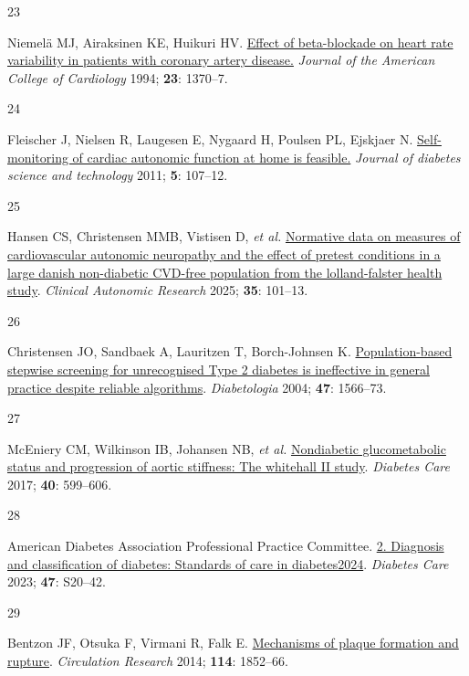 \documentclass[
  a4paper,
  headsepline=true,
  open=any]{scrbook}
\newlength{\cslhangindent}
\newlength{\csllabelwidth}
\newlength{\cslentryspacingunit} %
\newenvironment{CSLReferences}[2] %
 {%
  \setlength{\parindent}{0pt}
  \ifodd #1
  \let\oldpar\par
  \def\par{\hangindent=\cslhangindent\oldpar}
  \fi
  \setlength{\parskip}{#2\cslentryspacingunit}
 }%
 {}
\newcommand{\CSLLeftMargin}[1]{\parbox[t]{\csllabelwidth}{#1}}
\newcommand{\CSLRightInline}[1]{\parbox[t]{\linewidth - \csllabelwidth}{#1}\break}
\begin{document}
\begin{CSLReferences}{0}{0}
\leavevmode{}%
\CSLLeftMargin{23 }%
\CSLRightInline{Niemelä MJ, Airaksinen KE, Huikuri HV.
\href{https://doi.org/10.1016/0735-1097(94)90379-4}{Effect of
beta-blockade on heart rate variability in patients with coronary artery
disease.} \emph{Journal of the American College of Cardiology} 1994;
\textbf{23}: 1370--7.}

\leavevmode{}%
\CSLLeftMargin{24 }%
\CSLRightInline{Fleischer J, Nielsen R, Laugesen E, Nygaard H, Poulsen
PL, Ejskjaer N.
\href{https://doi.org/10.1177/193229681100500115}{Self-monitoring of
cardiac autonomic function at home is feasible.} \emph{Journal of
diabetes science and technology} 2011; \textbf{5}: 107--12.}

\leavevmode{}%
\CSLLeftMargin{25 }%
\CSLRightInline{Hansen CS, Christensen MMB, Vistisen D, \emph{et al.}
\href{https://doi.org/10.1007/s10286-024-01069-6}{Normative data on
measures of cardiovascular autonomic neuropathy and the effect of
pretest conditions in a large danish non-diabetic CVD-free population
from the lolland-falster health study}. \emph{Clinical Autonomic
Research} 2025; \textbf{35}: 101--13.}

\leavevmode{}%
\CSLLeftMargin{26 }%
\CSLRightInline{Christensen JO, Sandbaek A, Lauritzen T, Borch-Johnsen
K. \href{https://doi.org/10.1007/s00125-004-1496-2}{Population-based
stepwise screening for unrecognised Type 2 diabetes is ineffective in
general practice despite reliable algorithms}. \emph{Diabetologia} 2004;
\textbf{47}: 1566--73.}

\leavevmode{}%
\CSLLeftMargin{27 }%
\CSLRightInline{McEniery CM, Wilkinson IB, Johansen NB, \emph{et al.}
\href{https://doi.org/10.2337/dc16-1773}{Nondiabetic glucometabolic
status and progression of aortic stiffness: The whitehall II study}.
\emph{Diabetes Care} 2017; \textbf{40}: 599--606.}

\leavevmode{}%
\CSLLeftMargin{28 }%
\CSLRightInline{American Diabetes Association Professional Practice
Committee. \href{https://doi.org/10.2337/dc24-S002}{2. Diagnosis and
classification of diabetes: Standards of care in
diabetes{\textemdash}2024}. \emph{Diabetes Care} 2023; \textbf{47}:
S20--42.}

\leavevmode{}%
\CSLLeftMargin{29 }%
\CSLRightInline{Bentzon JF, Otsuka F, Virmani R, Falk E.
\href{https://doi.org/10.1161/CIRCRESAHA.114.302721}{Mechanisms of
plaque formation and rupture}. \emph{Circulation Research} 2014;
\textbf{114}: 1852--66.}


\end{CSLReferences}
\end{document}
